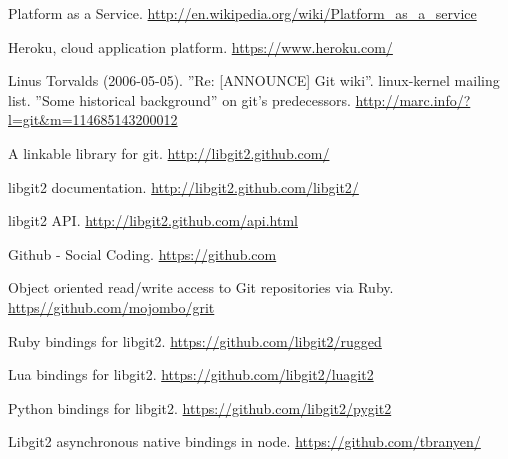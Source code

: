\begin{thebibliography}{99}
 Platform as a Service.
  \url{http://en.wikipedia.org/wiki/Platform_as_a_service}

 Heroku, cloud application platform.
  \url{https://www.heroku.com/}

 Linus Torvalds (2006-05-05). ”Re: [ANNOUNCE] Git wiki”.
  linux-kernel mailing list. ”Some historical background” on git’s predecessors.
  \url{http://marc.info/?l=git\&m=114685143200012}

 A linkable library for git.
  \url{http://libgit2.github.com/}

 libgit2 documentation.
  \url{http://libgit2.github.com/libgit2/}

 libgit2 API.
  \url{http://libgit2.github.com/api.html}

 Github - Social Coding.
  \url{https://github.com}

 Object oriented read/write access to Git repositories via Ruby.
  \url{https//github.com/mojombo/grit}

 Ruby bindings for libgit2.
  \url{https://github.com/libgit2/rugged}

 Lua bindings for libgit2.
  \url{https://github.com/libgit2/luagit2}

 Python bindings for libgit2.
  \url{https://github.com/libgit2/pygit2}

 Libgit2 asynchronous native bindings in node.
  \url{https://github.com/tbranyen/}

\end{thebibliography}
